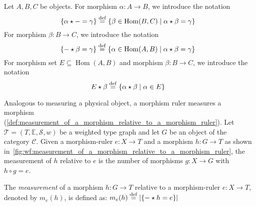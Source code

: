     \begin{figure}[H]
        \centering
        \caption{}
        \label{fig:wf:measurement_of_a_morphism_relative_to_a_morphism_ruler}
    \end{figure}  
\begin{notation}
Let \(A,B,C\) be objects. For morphism $\alpha\colon A\to B$, we introduce the notation 
          $$\{ \alpha \star - = \gamma \} \overset{\operatorname{def}}{=} \{ \beta \in \operatorname{Hom}(B, C) \mid \alpha \star \beta = \gamma \}$$ 
For morphism $\beta\colon B\to C$, we introduce the notation
          $$\{ - \star \beta = \gamma \}  \overset{\operatorname{def}}{=} \{ \alpha \in \operatorname{Hom}(A, B) \mid \alpha \star \beta = \gamma \}$$
For morphism set $E \subseteq \operatorname{Hom}(A,B)$ and morphism $\beta\colon B\to C$, we introduce the notation
          $$E \star \beta \overset{\operatorname{def}}{=} \{ \alpha \star \beta \mid \alpha \in E \}$$
\end{notation}
Analogous to measuring a physical object, a morphism ruler measures a morphism (\autoref{def:measurement_of_a_morphism_relative_to_a_morphism_ruler}).
Let \(\mathcal{T}=(T,\mathbb{E},\mathcal{S},w)\) be a weighted type graph and let \(G\) be an object of the category \(\mathcal{C}\).
Given a morphism-ruler \(e\colon X\to T\) and a morphism \(h\colon G\to T\) as shown in~\autoref{fig:wf:measurement_of_a_morphism_relative_to_a_morphism_ruler},
the measurement of \(h\) relative to \(e\) is the number of morphisms \(g \colon X\to G\) with \(h\circ g = e\). 
\begin{definition} 
    \label{def:measurement_of_a_morphism_relative_to_a_morphism_ruler}
    The \emph{measurement} of a morphism \( h:G \to T \) relative to a morphism-ruler \( e: X \to T \), denoted by $m_e(h)$, is defined as:
                \(
                m_e(h) 
                    \overset{\operatorname{def}}{=}
                |\{- \star h = e\}|
                \)
\end{definition}

